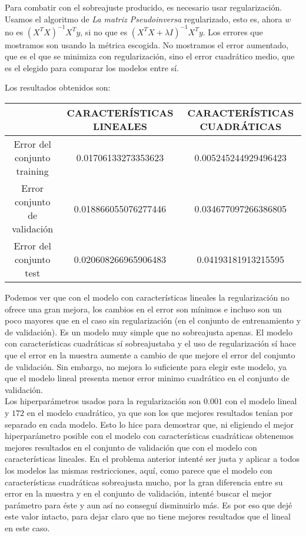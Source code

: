 \documentclass{article}
\begin{document}
Para combatir con el sobreajuste producido, es necesario usar regularización. Usamos el algoritmo de \textit{La matriz Pseudoinversa} regularizado, esto es, ahora $w$ no es $(X^TX)^{-1}X^Ty$, si no que es $(X^TX + \lambda I)^{-1}X^Ty$. Los errores que mostramos son usando la métrica escogida. No mostramos el error aumentado, que es el que se minimiza con regularización, sino el error cuadrático medio, que es el elegido para comparar los modelos entre sí.

Los resultados obtenidos son:

\begin{center}
\begin{tabular}{|c|c|c|}
\hline
\multicolumn{1}{|c|}{}& \textbf{CARACTERÍSTICAS LINEALES} &
\textbf{CARACTERÍSTICAS CUADRÁTICAS}  \\ \hline
  Error del conjunto training       & 0.01706133273353623  & 0.005245244929496423 \\
  Error conjunto de validación      & 0.018866055076277446 & 0.034677097266386805 \\
  Error del conjunto test           & 0.020608266965906483  & 0.04193181913215595 \\ \hline
\end{tabular}
\end{center}

Podemos ver que con el modelo con características lineales la regularización no ofrece una gran mejora, los cambios en el error son mínimos e incluso son un poco mayores que en el caso sin regularización (en el conjunto de entrenamiento y de validación). Es un modelo muy simple que no sobreajusta apenas. El modelo con características cuadráticas sí sobreajustaba y el uso de regularización sí hace que el error en la muestra aumente a cambio de que mejore el error del conjunto de validación. Sin embargo, no mejora lo suficiente para elegir este modelo, ya que el modelo lineal presenta menor error minimo cuadrático en el conjunto de validación.\\

Los hiperparámetros usados para la regularización son $0.001$ con el modelo lineal y $172$ en el modelo cuadrático, ya que son los que mejores resultados tenían por separado en cada modelo. Esto lo hice para demostrar que, ni eligiendo el mejor hiperparámetro posible con el modelo con características cuadráticas obtenemos mejores resultados en el conjunto de validación que con el modelo con características lineales. En el problema anterior intenté ser justa y aplicar a todos los modelos las mismas restricciones, aquí, como parece que el modelo con características cuadráticas sobreajusta mucho, por la gran diferencia entre su error en la muestra y en el conjunto de validación, intenté buscar el mejor parámetro para éste y aun así no conseguí disminuirlo más. Es por eso que dejé este valor intacto, para dejar claro que no tiene mejores resultados que el lineal en este caso.\\
\end{document}
